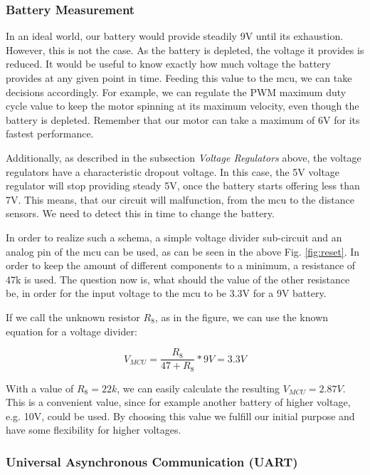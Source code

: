 \vspace{1cm}


\subsubsection{Battery Measurement}

In an ideal world, our battery would provide steadily 9V until its exhaustion. However, this is not the case. As the battery is depleted, the voltage it provides is reduced. It would be useful to know exactly how much voltage the battery provides at any given point in time. Feeding this value to the mcu, we can take decisions accordingly. For example, we can regulate the PWM maximum duty cycle value to keep the motor spinning at its maximum velocity, even though the battery is depleted. Remember that our motor can take a maximum of 6V for its fastest performance.

Additionally, as described in the subsection \textit{Voltage Regulators} above, the voltage regulators have a characteristic dropout voltage. In this case, the 5V voltage regulator will stop providing steady 5V, once the battery starts offering less than 7V. This means, that our circuit will malfunction, from the mcu to the distance sensors. We need to detect this in time to change the battery.

In order to realize such a schema, a simple voltage divider sub-circuit and an analog pin of the mcu can be used, as can be seen in the above Fig. \ref{fig:reset}.
In order to keep the amount of different components to a minimum, a resistance of 47k is used. The question now is, what should the value of the other resistance be, in order for the input voltage to the mcu to be 3.3V for a 9V battery. 

If we call the unknown resistor $R_8$, as in the figure, we can use the known equation for a voltage divider:

$$V_{MCU} = \frac{R_8}{47+R_8} * 9V = 3.3V$$

With a value of $ R_8 = 22k $, we can easily calculate the resulting $V_{MCU} = 2.87V$. This is a convenient value, since for example another battery of higher voltage, e.g. 10V, could be used. By choosing this value we fulfill our initial purpose and have some flexibility for higher voltages.

\FloatBarrier
\vspace{1cm}

\subsubsection{Universal Asynchronous Communication (UART)}


